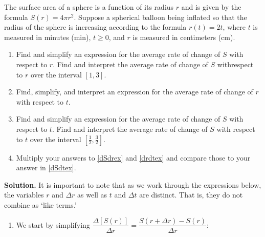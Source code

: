 \begin{ex}\label{surfaceareaex2chainrule}  The surface area of a sphere is a function of its radius $r$ and is given by the formula $S(r) = 4 \pi r^2$.  Suppose a spherical balloon being inflated so that the radius of the sphere is increasing according to the formula $r(t) = 2t$, where $t$ is measured in minutes (min), $t \geq 0$, and $r$ is measured in centimeters (cm). 

\begin{enumerate}

\item\label{dSdrex}  Find and simplify an expression for the average rate of change of $S$ with respect to $r$.   Find and interpret the average rate of change of $S$ withrespect to $r$  over the interval $[1, 3]$.

\item\label{drdtex} Find, simplify, and interpret an expression for the average rate of change of $r$ with respect to $t$.

\item\label{dSdtex} Find and simplify an expression for the average rate of change of $S$ with respect to $t$.  Find and interpret the average rate of change of $S$ with respect to $t$  over the interval $\left[\frac{1}{2}, \frac{3}{2}\right]$.


\item  Multiply your answers to \ref{dSdrex} and \ref{drdtex} and compare those to your answer in \ref{dSdtex}.

\end{enumerate}

{\bf Solution.}  It is important to note that as we work through the expressions below, the variables $r$ and $\Delta r$ as well as $t$ and $\Delta t$ are distinct. That is, they do not combine as `like terms.'

\begin{enumerate}

\item  We start by simplifying $\dfrac{\Delta[S(r)]}{\Delta r} = \dfrac{S(r+ \Delta r) - S(r)}{\Delta r}$:

\begin{longtable}{rcl}


\end{longtable}
\end{enumerate}
\end{ex}
